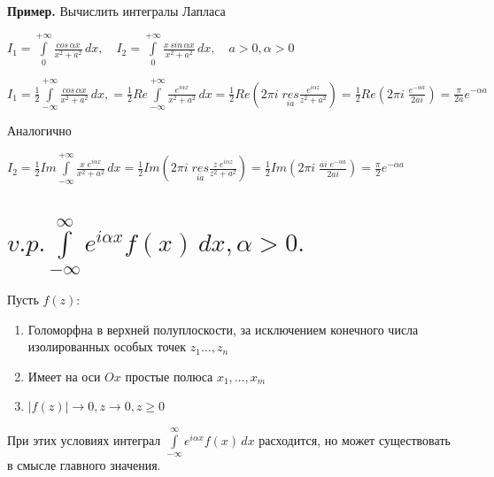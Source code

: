 \documentclass[a4paper, 12pt]{report}
\begin{document}
\textbf{Пример.} \quad Вычислить интегралы Лапласа
\begin{center}
    $I_1 = \int\limits_{0}^{+\infty} \frac{cos\,\alpha x}{x^2 + a^2}\, dx, \quad I_2 = \int\limits_{0}^{+\infty} \frac{x\, sin\,\alpha x}{x^2 + a^2}\, dx, \quad a > 0, \alpha > 0$
\end{center}
\par
$I_1 = \frac{1}{2}\int\limits_{-\infty}^{+\infty} \frac{cos\,\alpha x}{x^2 + a^2}\, dx, = \frac{1}{2}Re\int\limits_{-\infty}^{+\infty}\frac{e^{i\alpha x}}{x^2 + a^2} \, dx = \frac{1}{2} Re(2\pi i\; \overset{}{\underset{ia}{res}} \frac{e^{i\alpha z}}{z^2 + a^2}) = \frac{1}{2} Re(2\pi i\; \frac{e^{-\alpha a}}{2ai}) = \frac{\pi}{2a} e^{-\alpha a}$
\par\bigskip Аналогично
\par\bigskip
$I_2 = \frac{1}{2}Im\int\limits_{-\infty}^{+\infty}\frac{x\; e^{i\alpha x}}{x^2 + a^2} \, dx = \frac{1}{2} Im(2\pi i\; \overset{}{\underset{ia}{res}} \frac{z\;e^{i\alpha z}}{z^2 + a^2}) = \frac{1}{2} Im(2\pi i\; \frac{ai\; e^{-\alpha a}}{2ai}) = \frac{\pi}{2} e^{-\alpha a}$






\section{$v.p.  \int\limits_{-\infty}^{\infty} e^{i\alpha x} f(x) \, dx, \alpha>0.$}

Пусть $f(z)$:
\begin{enumerate}
    \item Голоморфна в верхней полуплоскости, за исключением конечного числа изолированных особых точек $z_1\dots,z_n$
    \item Имеет на оси $Ox$ простые полюса $x_1,\dots,x_m$
    \item $|f(z)|\rightarrow 0, z \rightarrow 0, z\geq 0$
\end{enumerate}

При этих условиях интеграл  $\int\limits_{-\infty}^{\infty} e^{i\alpha x} f(x) \, dx$  расходится, но может существовать в смысле главного значения.
\par\bigskip
\end{document}
